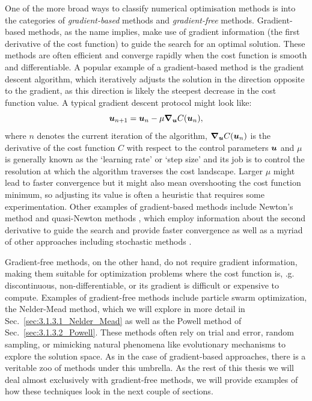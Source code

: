 One of the more broad ways to classify numerical optimisation methods is into the categories of \emph{gradient-based} methods and \emph{gradient-free} methods. Gradient-based methods, as the name implies, make use of gradient information (the first derivative of the cost function) to guide the search for an optimal solution. These methods are often efficient and converge rapidly when the cost function is smooth and differentiable. A popular example of a gradient-based method is the gradient descent algorithm, which iteratively adjusts the solution in the direction opposite to the gradient, as this direction is likely the steepest decrease in the cost function value. A typical gradient descent protocol might look like:
\begin{equation}\label{eq:gradient_descent}
    \boldsymbol{u}_{n + 1} = \boldsymbol{u}_n - \mu \grad_{\boldsymbol{u}} C(\boldsymbol{u}_n),
\end{equation}
where $n$ denotes the current iteration of the algorithm, $\grad_{\boldsymbol{u}} C(\boldsymbol{u}_n)$ is the derivative of the cost function $C$ with respect to the control parameters $\boldsymbol{u}$ and $\mu$ is generally known as the `learning rate' or `step size' and its job is to control the resolution at which the algorithm traverses the cost landscape. Larger $\mu$ might lead to faster convergence but it might also mean overshooting the cost function minimum, so adjusting its value is often a heuristic that requires some experimentation. Other examples of gradient-based methods include Newton's method and quasi-Newton methods \cite{suli_introduction_2003}, which employ information about the second derivative to guide the search and provide faster convergence as well as a myriad of other approaches including stochastic methods \cite{bottou_tradeoffs_2007}. 

Gradient-free methods, on the other hand, do not require gradient information, making them suitable for optimization problems where the cost function is, \@e.g.~ discontinuous, non-differentiable, or its gradient is difficult or expensive to compute. Examples of gradient-free methods include particle swarm optimization\cite{bonyadi_particle_2017}, the Nelder-Mead method, which we will explore in more detail in Sec.~\ref{sec:3.1.3.1_Nelder_Mead} as well as the Powell method of Sec.~\ref{sec:3.1.3.2_Powell}. These methods often rely on trial and error, random sampling, or mimicking natural phenomena like evolutionary mechanisms\cite{vikhar_evolutionary_2016} to explore the solution space. As in the case of gradient-based approaches, there is a veritable zoo of methods under this umbrella. As the rest of this thesis we will deal almost exclusively with gradient-free methods, we will provide examples of how these techniques look in the next couple of sections.

